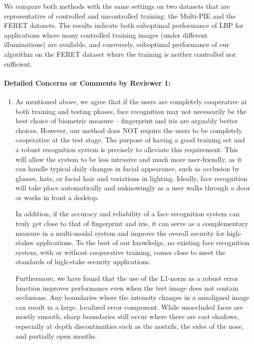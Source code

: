\documentclass[11pt]{article}
\begin{document}
We compare both methods with the same settings on two datasets that are representative of controlled and uncontrolled training: the Multi-PIE and the FERET
datasets.  The results indicate both suboptimal performance of LBP for applications where many controlled training images (under different illuminations) are available, and conversely, suboptimal performance of our algorithm on the FERET dataset where the training is neither controlled nor sufficient.

\paragraph{Detailed Concerns or Comments by Reviewer 1:}
\begin{enumerate}
\item As mentioned above, we agree that if the users are completely cooperative at
both training and testing phases, face recognition may not necessarily be the best choice of biometric measure -- fingerprint
and iris are arguably better choices. However, our method does NOT require the users to be completely cooperative at the test stage. The purpose of having a good training set and a robust recognition system is precisely to alleviate this requirement. This will allow the system to be less intrusive and much more user-friendly, 
as it can handle typical daily changes in facial appearance, such as occlusion by glasses, hats, or facial hair and variations in lighting. Ideally, face recognition will take place automatically and unknowingly as a user walks through a door or works in front a desktop.

In addition, if the accuracy and reliability of a face recognition system can truly get close to that of fingerprint and iris, it can serve as a complementary measure in a multi-modal system and improve the overall security for high-stakes applications. To the best of our knowledge, no existing face recognition system, with or without cooperative training, comes close to meet the standards of high-stake security applications. 

Furthermore, we have found that the use of the L1-norm as a robust error function improves performance 
even when the test image does not contain occlusions.  Any boundaries where the intensity changes in a
misaligned image can result in a large, localized error component.  While
unoccluded faces are mostly smooth, sharp boundaries still occur where there
are cast shadows, especially at depth discontinuities such as the nostrils, the
sides of the nose, and partially open mouths.  



\end{enumerate}
\end{document}
